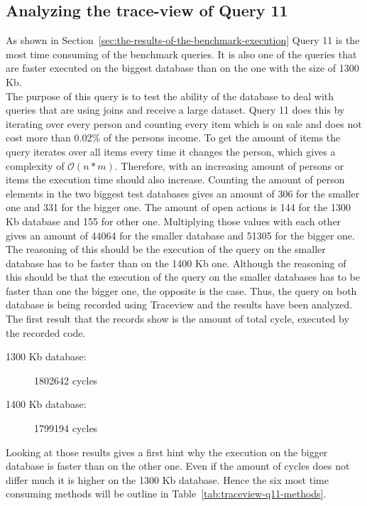 \subsection*{Analyzing the trace-view of Query 11}
\label{sec:analyzing-the-trace-view-of-query-11}
As shown in Section~\ref{sec:the-results-of-the-benchmark-execution} Query 11 is the most time consuming of the benchmark queries.
It is also one of the queries that are faster executed on the biggest database than on the one with the size of 1300 Kb.\\
The purpose of this query is to test the ability of the database to deal with queries that are using joins and receive a large dataset.
Query 11 does this by iterating over every person and counting every item which is on sale and does not cost more than 0.02\% of the persons income.
To get the amount of items the query iterates over all items every time it changes the person, which gives a complexity of $\mathcal O(n*m)$.
Therefore, with an increasing amount of persons or items the execution time should also increase.
Counting the amount of person elements in the two biggest test databases gives an amount of 306 for the smaller one and 331 for the bigger one.
The amount of open actions is 144 for the 1300 Kb database and 155 for other one.
Multiplying those values with each other gives an amount of 44064 for the smaller database and 51305 for the bigger one.
The reasoning of this should be the execution of the query on the smaller database has to be faster than on the 1400 Kb one.
Although the reasoning of this should be that the execution of the query on the smaller databases has to be faster than one the bigger one, the opposite is the case.
Thus, the query on both database is being recorded using Traceview and the results have been analyzed.\\
The first result that the records show is the amount of total cycle, executed by the recorded code.
\begin{description}
  \item[1300 Kb database:] 1802642 cycles
  \item[1400 Kb database:] 1799194 cycles
\end{description}
Looking at those results gives a first hint why the execution on the bigger database is faster than on the other one.
Even if the amount of cycles does not differ much it is higher on the 1300 Kb database.
Hence the six most time consuming methods will be outline in Table~\ref{tab:traceview-q11-methods}.\\
